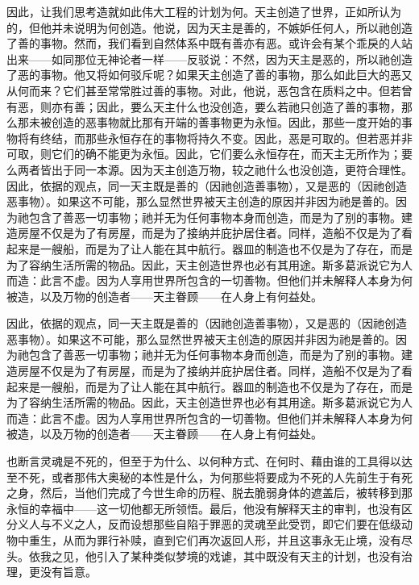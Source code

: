 因此，让我们思考造就如此伟大工程的计划为何。天主创造了世界，正如所认为的，但他并未说明为何创造。他说，因为天主是善的，不嫉妒任何人，所以祂创造了善的事物。然而，我们看到自然体系中既有善亦有恶。或许会有某个乖戾的人站出来——如同那位无神论者一样——反驳说：不然，因为天主是恶的，所以祂创造了恶的事物。他又将如何驳斥呢？如果天主创造了善的事物，那么如此巨大的恶又从何而来？它们甚至常常胜过善的事物。对此，他说，恶包含在质料之中。但若曾有恶，则亦有善；因此，要么天主什么也没创造，要么若祂只创造了善的事物，那么那未被创造的恶事物就比那有开端的善事物更为永恒。因此，那些一度开始的事物将有终结，而那些永恒存在的事物将持久不变。因此，恶是可取的。但若恶并非可取，则它们的确不能更为永恒。因此，它们要么永恒存在，而天主无所作为；要么两者皆出于同一本源。因为天主创造万物，较之祂什么也没创造，更符合理性。因此，依据的观点，同一天主既是善的（因祂创造善事物），又是恶的（因祂创造恶事物）。如果这不可能，那么显然世界被天主创造的原因并非因为祂是善的。因为祂包含了善恶一切事物；祂并无为任何事物本身而创造，而是为了别的事物。建造房屋不仅是为了有房屋，而是为了接纳并庇护居住者。同样，造船不仅是为了看起来是一艘船，而是为了让人能在其中航行。器皿的制造也不仅是为了存在，而是为了容纳生活所需的物品。因此，天主创造世界也必有其用途。斯多葛派说它为人而造：此言不虚。因为人享用世界所包含的一切善物。但他们并未解释人本身为何被造，以及万物的创造者——天主眷顾——在人身上有何益处。\par

因此，依据的观点，同一天主既是善的（因祂创造善事物），又是恶的（因祂创造恶事物）。如果这不可能，那么显然世界被天主创造的原因并非因为祂是善的。因为祂包含了善恶一切事物；祂并无为任何事物本身而创造，而是为了别的事物。建造房屋不仅是为了有房屋，而是为了接纳并庇护居住者。同样，造船不仅是为了看起来是一艘船，而是为了让人能在其中航行。器皿的制造也不仅是为了存在，而是为了容纳生活所需的物品。因此，天主创造世界也必有其用途。斯多葛派说它为人而造：此言不虚。因为人享用世界所包含的一切善物。但他们并未解释人本身为何被造，以及万物的创造者——天主眷顾——在人身上有何益处。\par

也断言灵魂是不死的，但至于为什么、以何种方式、在何时、藉由谁的工具得以达至不死，或者那伟大奥秘的本性是什么，为何那些将要成为不死的人先前生于有死之身，然后，当他们完成了今世生命的历程、脱去脆弱身体的遮盖后，被转移到那永恒的幸福中——这一切他都无所领悟。最后，他没有解释天主的审判，也没有区分义人与不义之人，反而设想那些自陷于罪恶的灵魂至此受罚，即它们要在低级动物中重生，从而为罪行补赎，直到它们再次返回人形，并且这事永无止境，没有尽头。依我之见，他引入了某种类似梦境的戏谑，其中既没有天主的计划，也没有治理，更没有旨意。\par

